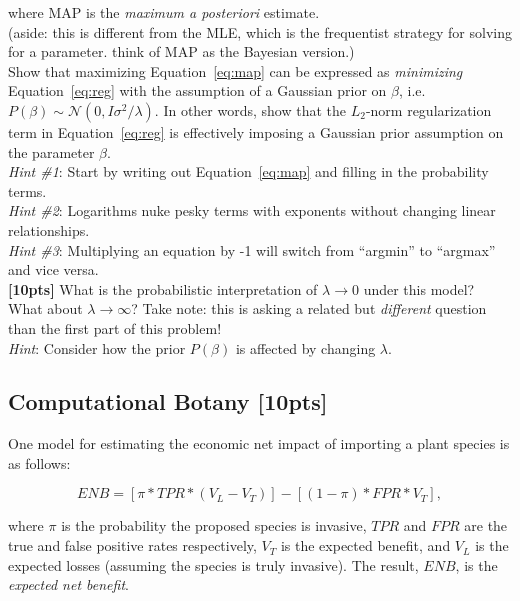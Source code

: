 \documentclass[paper=a4, fontsize=11pt]{scrartcl} %
\numberwithin{figure}{section} %
\numberwithin{table}{section} %
\begin{document}
where MAP is the \emph{maximum a posteriori} estimate. \\

(aside: this is different from the MLE, which is the frequentist strategy for solving for a parameter. think of MAP as the Bayesian version.) \\

Show that maximizing Equation~\ref{eq:map} can be expressed as \emph{minimizing} Equation~\ref{eq:reg} with the assumption of a Gaussian prior on $\beta$, i.e. $P(\beta) \sim \mathcal{N}(0, I\sigma^2 / \lambda)$. In other words, show that the $L_2$-norm regularization term in Equation~\ref{eq:reg} is effectively imposing a Gaussian prior assumption on the parameter $\beta$. \\

\emph{Hint \#1}: Start by writing out Equation~\ref{eq:map} and filling in the probability terms. \\

\emph{Hint \#2}: Logarithms nuke pesky terms with exponents without changing linear relationships. \\

\emph{Hint \#3}: Multiplying an equation by -1 will switch from ``argmin'' to ``argmax'' and vice versa. \\

\textbf{[10pts]} What is the probabilistic interpretation of $\lambda \rightarrow 0$ under this model? What about $\lambda \rightarrow \infty$? Take note: this is asking a related but \emph{different} question than the first part of this problem! \\

\emph{Hint}: Consider how the prior $P(\beta)$ is affected by changing $\lambda$.

\subsection{Computational Botany \textbf{[10pts]}}

One model for estimating the economic net impact of importing a plant species is as follows:

$$
ENB = \left[ \pi * TPR * (V_L - V_T) \right] - \left[ (1 - \pi) * FPR * V_T \right],
$$

where $\pi$ is the probability the proposed species is invasive, $TPR$ and $FPR$ are the true and false positive rates respectively, $V_T$ is the expected benefit, and $V_L$ is the expected losses (assuming the species is truly invasive). The result, $ENB$, is the \emph{expected net benefit}. \\
\end{document}
